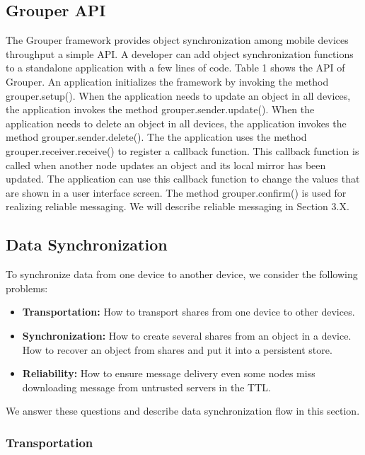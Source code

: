 \documentclass[twocolumn,10pt]{article}
\begin{document}
\subsection{Grouper API}%

The Grouper framework provides object synchronization among mobile devices throughput a simple API.
A developer can add object synchronization functions to a standalone application with a few lines of code.
Table 1 shows the API of Grouper.
An application initializes the framework by invoking the method grouper.setup().
When the application needs to update an object in all devices, the application invokes the method grouper.sender.update().
When the application needs to delete an object in all devices, the application invokes the method grouper.sender.delete().
The the application uses the method grouper.receiver.receive() to register a callback function.
This callback function is called when another node updates an object and its local mirror has been updated.
The application can use this callback function to change the values that are shown in a user interface screen.
The method grouper.confirm() is used for realizing reliable messaging.
We will describe reliable messaging in Section 3.X.

\subsection{Data Synchronization}

To synchronize data from one device to another device, we consider the following problems:

\begin{itemize}
	\setlength{\itemsep}{1pt}
	\setlength{\parskip}{0pt}
	\setlength{\parsep}{0pt}
	\item \textbf{Transportation:}
	How to transport shares from one device to other devices.
	\item \textbf{Synchronization:}
	How to create several shares from an object in a device. 
	How to recover an object from shares and put it into a persistent store.
	\item \textbf{Reliability:}
	How to ensure message delivery even some nodes miss downloading message from untrusted servers in the TTL.
\end{itemize}

We answer these questions and describe data synchronization flow in this section.

\subsubsection{Transportation}
\end{document}
